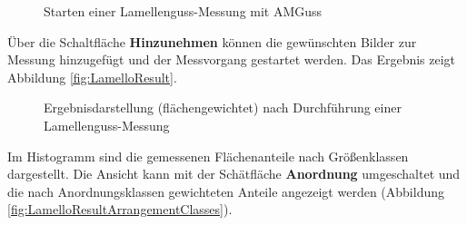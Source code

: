 \documentclass[
fontsize=10pt, 
listof = totoc,
parskip = half	
]{report}
\begin{document}
\begin{figure}[H]
	\centering
	\caption{Starten einer Lamellenguss-Messung mit AMGuss}
	\label{fig:LamelloResultWindowBlank}
\end{figure}

\noindent Über die Schaltfläche \textbf{\glqq Hinzunehmen\grqq} können die gewünschten Bilder zur Messung hinzugefügt und der Messvorgang gestartet werden. Das Ergebnis zeigt Abbildung \ref{fig:LamelloResult}.

\begin{figure}[H]
	\centering
	\caption{Ergebnisdarstellung (flächengewichtet) nach Durchführung einer Lamellenguss-Messung}
	\label{fig:LamelloResultArea}
\end{figure}

\noindent Im Histogramm sind die gemessenen Flächenanteile nach Größenklassen dargestellt. Die Ansicht kann mit der Schätfläche \textbf{\glqq Anordnung\grqq} umgeschaltet und die nach Anordnungsklassen gewichteten Anteile angezeigt werden (Abbildung \ref{fig:LamelloResultArrangementClasses}).
\end{document}

